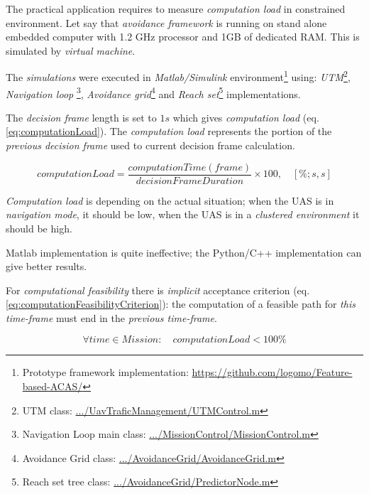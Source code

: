 The practical application requires to measure \emph{computation load} in constrained environment. Let say that \emph{avoidance framework} is running on stand alone embedded computer with 1.2 GHz processor and 1GB of dedicated RAM. This is simulated by \emph{virtual machine}.

The \emph{simulations} were executed in \emph{Matlab/Simulink} environment\footnote{Prototype framework implementation: \url{https://github.com/logomo/Feature-based-ACAS/}} using: \emph{UTM}\footnote{UTM  class: \url{.../UavTraficManagement/UTMControl.m}}, \emph{Navigation loop} \footnote{Navigation Loop main class: \url{.../MissionControl/MissionControl.m}}, \emph{Avoidance grid}\footnote{Avoidance Grid class: \url{.../AvoidanceGrid/AvoidanceGrid.m}} and \emph{Reach set}\footnote{Reach set tree class: \url{.../AvoidanceGrid/PredictorNode.m}} implementations. 

The \emph{decision frame} length is set to $1 s$ which gives \emph{computation load} (eq. \ref{eq:computationLoad}). The \emph{computation load} represents the portion of the \emph{previous decision frame} used to current decision frame calculation.

\begin{equation}\label{eq:computationLoad}
    computationLoad=\frac{computationTime(frame)}{decisionFrameDuration}\times 100, \quad [\%;s,s]
\end{equation}

\begin{note}
    \emph{Computation load} is depending on the actual situation;  when the UAS is in \emph{navigation mode}, it should be low, when the UAS is in a \emph{clustered environment} it should be high.
    
    Matlab implementation is quite ineffective; the Python/C++ implementation can give better results.
    
    For \emph{computational feasibility} there is \emph{implicit} acceptance criterion (eq. \ref{eq:computationFeasibilityCriterion}): the computation of a feasible path for \emph{this time-frame} must end in the \emph{previous time-frame}.
    
    \begin{equation}\label{eq:computationFeasibilityCriterion}
        \forall time \in Mission:\quad computation Load < 100\%
    \end{equation}    
\end{note}